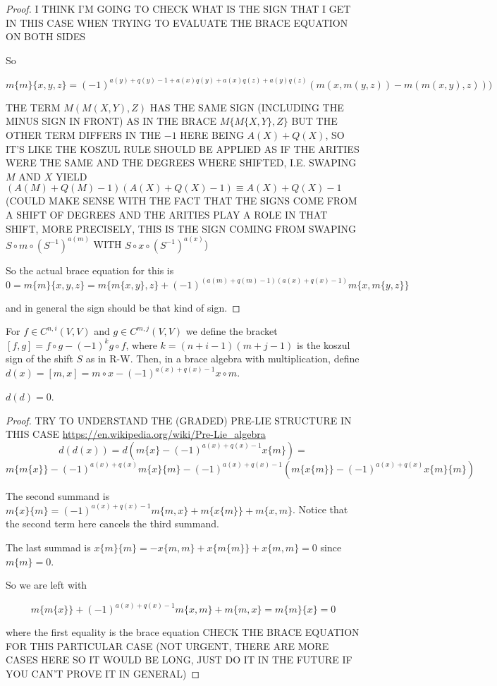 \documentclass[twoside]{article}
\begin{document}
\begin{proof}

I THINK I'M GOING TO CHECK WHAT IS THE SIGN THAT I GET IN THIS CASE WHEN TRYING TO EVALUATE THE BRACE EQUATION ON BOTH SIDES

So 

$$m\{m\}\{x,y,z\}=(-1)^{a(y)+q(y)-1+a(x)q(y)+a(x)q(z)+a(y)q(z)}(m(x,m(y,z))-m(m(x,y),z)))$$

THE TERM $M(M(X,Y),Z)$ HAS THE SAME SIGN (INCLUDING THE MINUS SIGN IN FRONT) AS IN THE BRACE $M\{M\{X,Y\},Z\}$ BUT THE OTHER TERM DIFFERS IN THE $-1$ HERE BEING $A(X)+Q(X)$, SO IT'S LIKE THE KOSZUL RULE SHOULD BE APPLIED AS IF THE ARITIES WERE THE SAME AND THE DEGREES WHERE SHIFTED, I.E. SWAPING $M$ AND $X$ YIELD $(A(M)+Q(M)-1)(A(X)+Q(X)-1)\equiv A(X)+Q(X)-1$ (COULD MAKE SENSE WITH THE FACT THAT THE SIGNS COME FROM A SHIFT OF DEGREES AND THE ARITIES PLAY A ROLE IN THAT SHIFT, MORE PRECISELY, THIS IS THE SIGN COMING FROM SWAPING $S\circ m\circ (S^{-1})^{a(m)}$ WITH $S\circ x\circ (S^{-1})^{a(x)}$)

So the actual brace equation for this is 
$$0=m\{m\}\{x,y,z\}=m\{m\{x,y\},z\}+(-1)^{(a(m)+q(m)-1)(a(x)+q(x)-1)}m\{x,m\{y,z\}\}$$

and in general the sign should be that kind of sign.
\end{proof}

For $f\in C^{n,i}(V,V)$ and $g\in C^{m,j}(V,V)$ we define the bracket $[f,g]=f\circ g-(-1)^kg\circ f$, where $k=(n+i-1)(m+j-1)$ is the koszul sign of the shift $S$ as in R-W. Then, in a brace algebra with multiplication, define $d(x)=[m,x]=m\circ x-(-1)^{a(x)+q(x)-1}x\circ m$.

\begin{lemma}
$d(d)=0$. 
\end{lemma}
\begin{proof}
TRY TO UNDERSTAND THE (GRADED) PRE-LIE STRUCTURE IN THIS CASE \url{https://en.wikipedia.org/wiki/Pre-Lie_algebra}
$$d(d(x))=d(m\{x\}-(-1)^{a(x)+q(x)-1}x\{m\})=$$ 
$$m\{m\{x\}\}-(-1)^{a(x)+q(x)}m\{x\}\{m\}-(-1)^{a(x)+q(x)-1}(m\{x\{m\}\}-(-1)^{a(x)+q(x)}x\{m\}\{m\})$$




The second summand is 
$m\{x\}\{m\}=(-1)^{a(x)+q(x)-1}m\{m,x\}+m\{x\{m\}\}+m\{x,m\}$. Notice that the second term here cancels the third summand. 


The last summad is
$x\{m\}\{m\}=-x\{m,m\}+x\{m\{m\}\}+x\{m,m\}=0$ since $m\{m\}=0$.

So we are left with

$$m\{m\{x\}\}+(-1)^{a(x)+q(x)-1}m\{x,m\}+m\{m,x\}=m\{m\}\{x\}=0$$

where the first equality is the brace equation CHECK THE BRACE EQUATION FOR THIS PARTICULAR CASE (NOT URGENT, THERE ARE MORE CASES HERE SO IT WOULD BE LONG, JUST DO IT IN THE FUTURE IF YOU CAN'T PROVE IT IN GENERAL)
\end{proof}
\end{document}
